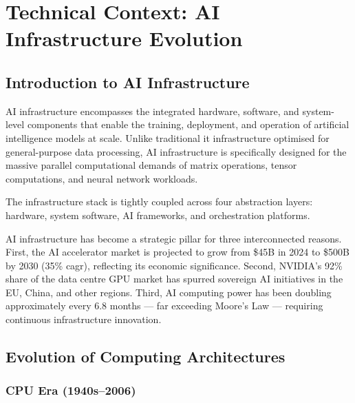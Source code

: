 
\section{Technical Context: AI Infrastructure Evolution}
\label{sec:technical-context}

\subsection{Introduction to AI Infrastructure}
\label{subsec:ai-infra-intro}

AI infrastructure encompasses the integrated hardware, software, and
system-level components that enable the training, deployment, and operation of
artificial intelligence models at scale. Unlike traditional \acrshort{it}
infrastructure optimised for general-purpose data processing, AI infrastructure
is specifically designed for the massive parallel computational demands of
matrix operations, tensor computations, and neural network workloads.

The infrastructure stack is tightly coupled across four abstraction layers:
hardware, system software, AI frameworks, and orchestration platforms.

AI infrastructure has become a strategic pillar for three interconnected
reasons. First, the AI accelerator market is projected to grow from
\$45B in 2024 to \$500B by 2030 (35\% \acrshort{cagr}), reflecting its
economic significance. Second, NVIDIA's 92\% share of the data centre GPU
market has spurred sovereign AI initiatives in the EU, China, and other regions.
Third, AI computing power has been doubling approximately every 6.8 months —
far exceeding Moore's Law — requiring continuous infrastructure innovation.

\subsection{Evolution of Computing Architectures}
\label{subsec:arch-evolution}

\subsubsection{CPU Era (1940s–2006)}
\label{subsubsec:cpu-era}

